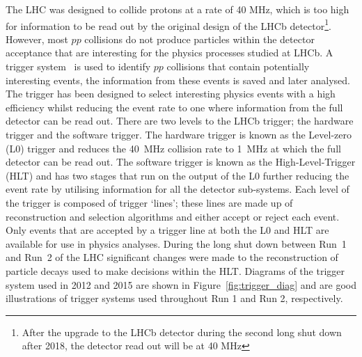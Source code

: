 The LHC was designed to collide protons at a rate of 40 MHz, which is too high for information to be read out by the original design of the LHCb detector\footnote{After the upgrade to the LHCb detector during the second long shut down after 2018, the detector read out will be at 40 MHz}. However, most $pp$ collisions do not produce particles within the detector acceptance that are interesting for the physics processes studied at LHCb. A trigger system~\cite{Alves:2008zz,Aaij:2012me,Albrecht:2013fba} is used to identify $pp$ collisions that contain potentially interesting events, the information from these events is saved and later analysed. The trigger has been designed to select interesting physics events with a high efficiency whilst reducing the event rate to one where information from the full detector can be read out.  There are two levels to the LHCb trigger; the hardware trigger and the software trigger. The hardware trigger is known as the Level-zero (L0) trigger and reduces the 40~MHz collision rate to 1~MHz at which the full detector can be read out. The software trigger is known as the High-Level-Trigger (HLT) and has two stages that run on the output of the L0 further reducing the event rate by utilising information for all the detector sub-systems. Each level of the trigger is composed of trigger `lines'; these lines are made up of reconstruction and selection algorithms and either accept or reject each event. Only events that are accepted by a trigger line at both the L0 and HLT are available for use in physics analyses. 
During the long shut down between Run~1 and Run~2 of the LHC significant changes were made to the reconstruction of particle decays used to make decisions within the HLT. Diagrams of the trigger system used in 2012 and 2015 are shown in Figure~\ref{fig:trigger_diag} and are good illustrations of trigger systems used throughout Run 1 and Run 2, respectively.


